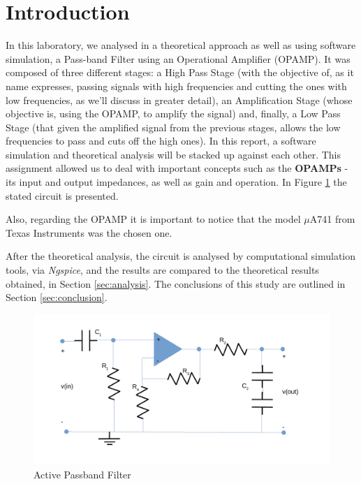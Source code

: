 \section{Introduction}
\label{sec:introduction}

In this laboratory, we analysed in a theoretical approach as well as using software simulation, a Pass-band Filter using an Operational Amplifier (OPAMP).
It was composed of three different stages: a High Pass Stage (with the objective of, as it name expresses, passing signals with high frequencies and cutting the ones with low frequencies, as we'll discuss in greater detail), an Amplification Stage (whose objective is, using the OPAMP, to amplify the signal) and, finally, a Low Pass Stage (that given the amplified signal from the previous stages, allows the low frequencies to pass and cuts off the high ones). In this report, a software simulation and theoretical analysis will be stacked up against each other. This assignment allowed us to deal with important concepts such as the \textbf{OPAMPs} - its input and output impedances, as well as gain and operation. In Figure \ref{fig:circuitol5} the stated circuit is presented. 

Also, regarding the OPAMP it is important to notice that the model $\mu$A741 from Texas Instruments was the chosen one. 

After the theoretical analysis, the circuit is analysed by computational simulation tools, via \textit{Ngspice}, and the results are compared to the theoretical results obtained, in Section \ref{sec:analysis}. The conclusions of this study are outlined in Section \ref{sec:conclusion}.

\begin{figure}[h] \centering
\includegraphics[width=1\linewidth]{circuitl5_old.pdf}
\caption{Active Passband Filter}
\label{fig:circuitol5}
\end{figure}

\clearpage
